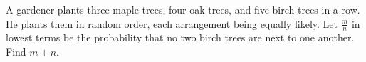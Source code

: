 A gardener plants three maple trees, four oak trees, and five birch trees in a row.  He plants them in random order, each arrangement being equally likely.  Let $\frac{m}{n}$ in lowest terms be the probability that no two birch trees are next to one another.  Find $m + n$.